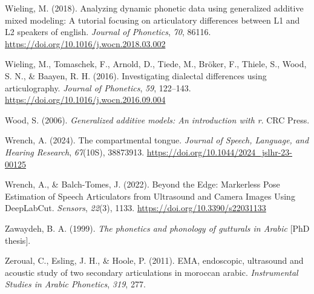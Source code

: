 \documentclass[
  man,
  longtable,
  nolmodern,
  notxfonts,
  notimes,
  colorlinks=true,linkcolor=blue,citecolor=blue,urlcolor=blue]{apa7}
\newlength{\cslhangindent}
\newenvironment{CSLReferences}[2] %
 {\begin{list}{}{%
  \setlength{\itemindent}{0pt}
  \setlength{\leftmargin}{0pt}
  \setlength{\parsep}{0pt}
  \ifodd #1
   \setlength{\leftmargin}{\cslhangindent}
   \setlength{\itemindent}{-1\cslhangindent}
  \fi
  \setlength{\itemsep}{#2\baselineskip}}}
 {\end{list}}
\begin{document}
\begin{CSLReferences}{1}{0}
Wieling, M. (2018). Analyzing dynamic phonetic data using generalized
additive mixed modeling: A tutorial focusing on articulatory differences
between L1 and L2 speakers of english. \emph{Journal of Phonetics},
\emph{70}, 86116. \url{https://doi.org/10.1016/j.wocn.2018.03.002}

Wieling, M., Tomaschek, F., Arnold, D., Tiede, M., Bröker, F., Thiele,
S., Wood, S. N., \& Baayen, R. H. (2016). Investigating dialectal
differences using articulography. \emph{Journal of Phonetics},
\emph{59}, 122--143. \url{https://doi.org/10.1016/j.wocn.2016.09.004}

Wood, S. (2006). \emph{Generalized additive models: An introduction with
r}. CRC Press.

Wrench, A. (2024). The compartmental tongue. \emph{Journal of Speech,
Language, and Hearing Research}, \emph{67}(10S), 38873913.
\url{https://doi.org/10.1044/2024_jslhr-23-00125}

Wrench, A., \& Balch-Tomes, J. (2022). Beyond the Edge: Markerless Pose
Estimation of Speech Articulators from Ultrasound and Camera Images
Using DeepLabCut. \emph{Sensors}, \emph{22}(3), 1133.
\url{https://doi.org/10.3390/s22031133}

Zawaydeh, B. A. (1999). \emph{The phonetics and phonology of gutturals
in Arabic} {[}PhD thesis{]}.

Zeroual, C., Esling, J. H., \& Hoole, P. (2011). EMA, endoscopic,
ultrasound and acoustic study of two secondary articulations in moroccan
arabic. \emph{Instrumental Studies in Arabic Phonetics}, \emph{319},
277.

\end{CSLReferences}
\end{document}
